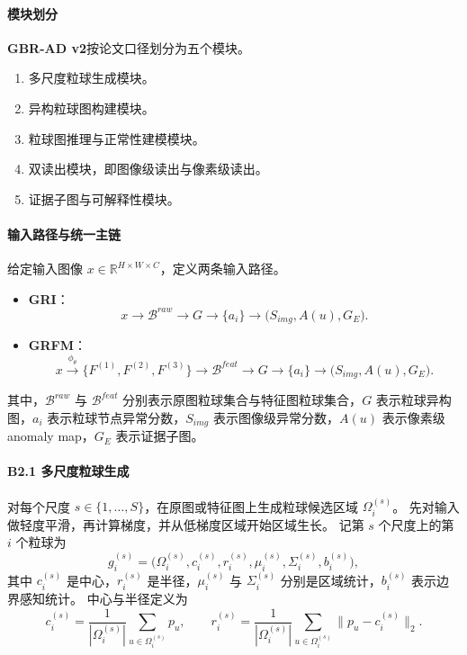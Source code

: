 \documentclass[UTF8,a4paper]{ctexart}
\newcommand{\gri}{\textbf{GRI}}
\newcommand{\grfm}{\textbf{GRFM}}
\newcommand{\gbrvtwo}{\textbf{GBR-AD v2}}
\begin{document}
\paragraph{模块划分}
\gbrvtwo 按论文口径划分为五个模块。
\begin{enumerate}
  \item 多尺度粒球生成模块。
  \item 异构粒球图构建模块。
  \item 粒球图推理与正常性建模模块。
  \item 双读出模块，即图像级读出与像素级读出。
  \item 证据子图与可解释性模块。
\end{enumerate}

\paragraph{输入路径与统一主链}
给定输入图像 $x\in\mathbb{R}^{H\times W\times C}$，定义两条输入路径。
\begin{itemize}
  \item \gri：
  \begin{equation}
    x \rightarrow \mathcal{B}^{raw} \rightarrow G \rightarrow \{a_i\} \rightarrow \big(S_{img},A(u),G_E\big).
  \end{equation}
  \item \grfm：
  \begin{equation}
    x \xrightarrow{\phi_\theta} \{F^{(1)},F^{(2)},F^{(3)}\}
    \rightarrow \mathcal{B}^{feat}
    \rightarrow G
    \rightarrow \{a_i\}
    \rightarrow \big(S_{img},A(u),G_E\big).
  \end{equation}
\end{itemize}
其中，$\mathcal{B}^{raw}$ 与 $\mathcal{B}^{feat}$ 分别表示原图粒球集合与特征图粒球集合，$G$ 表示粒球异构图，$a_i$ 表示粒球节点异常分数，$S_{img}$ 表示图像级异常分数，$A(u)$ 表示像素级 anomaly map，$G_E$ 表示证据子图。

\paragraph{B2.1 多尺度粒球生成}
对每个尺度 $s\in\{1,\dots,S\}$，在原图或特征图上生成粒球候选区域 $\Omega_i^{(s)}$。
先对输入做轻度平滑，再计算梯度，并从低梯度区域开始区域生长。
记第 $s$ 个尺度上的第 $i$ 个粒球为
\begin{equation}
  g_i^{(s)}=\big(\Omega_i^{(s)},c_i^{(s)},r_i^{(s)},\mu_i^{(s)},\Sigma_i^{(s)},b_i^{(s)}\big),
\end{equation}
其中 $c_i^{(s)}$ 是中心，$r_i^{(s)}$ 是半径，$\mu_i^{(s)}$ 与 $\Sigma_i^{(s)}$ 分别是区域统计，$b_i^{(s)}$ 表示边界感知统计。
中心与半径定义为
\begin{equation}
  c_i^{(s)}=\frac{1}{|\Omega_i^{(s)}|}\sum_{u\in\Omega_i^{(s)}}p_u,
  \qquad
  r_i^{(s)}=\frac{1}{|\Omega_i^{(s)}|}\sum_{u\in\Omega_i^{(s)}}\lVert p_u-c_i^{(s)}\rVert_2.
\end{equation}
\end{document}
